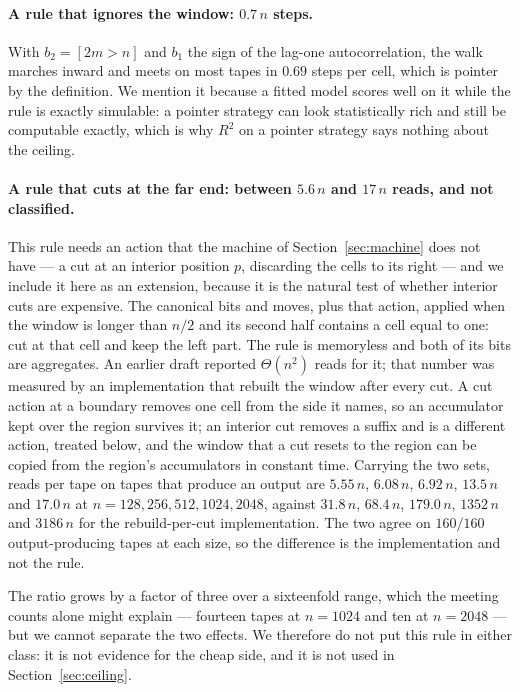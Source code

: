 \documentclass[11pt]{article}
\begin{document}
\paragraph{A rule that ignores the window: $0.7\,n$ steps.} With $b_2=[2m>n]$ and $b_1$ the sign of the
lag-one autocorrelation, the walk marches inward and meets on most tapes in $0.69$ steps per cell, which
is pointer by the definition. We mention it because a fitted model scores well on it while the rule is exactly simulable:
a pointer strategy can look statistically rich and still be computable exactly, which is why $R^2$ on a
pointer strategy says nothing about the ceiling.

\paragraph{A rule that cuts at the far end: between $5.6\,n$ and $17\,n$ reads, and not classified.} This rule needs an action that the machine
of Section~\ref{sec:machine} does not have --- a cut at an interior position $p$, discarding the
cells to its right --- and we include it here as an extension, because it is the natural test of
whether interior cuts are expensive. The canonical bits and moves, plus that action, applied when the
window is longer than $n/2$ and its second half contains a cell equal to one: cut at that cell and
keep the left part. The rule is memoryless and both of its bits are aggregates. An
earlier draft reported $\Theta(n^2)$ reads for it; that number was measured by an implementation that
rebuilt the window after every cut. A cut action at a boundary removes one cell from the side it
names, so an accumulator kept over the region survives it; an interior cut removes a suffix and is a
different action, treated below, and the window that a cut resets to the region can be copied from the
region's accumulators in constant time. Carrying the two sets, reads per tape on tapes that produce an
output are $5.55\,n$, $6.08\,n$, $6.92\,n$, $13.5\,n$ and $17.0\,n$ at $n=128,256,512,1024,2048$,
against $31.8\,n$, $68.4\,n$, $179.0\,n$, $1352\,n$ and $3186\,n$ for the rebuild-per-cut
implementation. The two agree on $160/160$ output-producing tapes at each size, so the difference is the
implementation and not the rule.

The ratio grows by a factor of three over a sixteenfold range, which the meeting counts alone
might explain --- fourteen tapes at $n=1024$ and ten at $n=2048$ --- but we cannot separate the two
effects. We therefore do not put this rule in either class: it is not evidence for the cheap side,
and it is not used in Section~\ref{sec:ceiling}.
\end{document}
